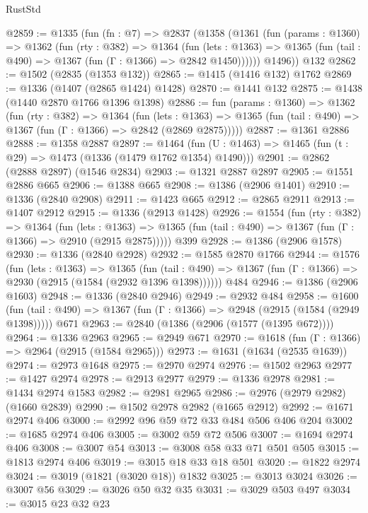 \begin{lexlean}{RustStd}
\begin{coremodule}
@2859 := @1335
    (fun (fn : @7) =>
    @2837
      (@1358
        (@1361
          (fun (params : @1360) =>
          @1362
            (fun (rty : @382) =>
            @1364
              (fun (lets : @1363) =>
              @1365 (fun (tail : @490) => @1367 (fun (Γ : @1366) => @2842 @1450))))))
        @1496))
    @132
@2862 := @1502 (@2835 (@1353 @132))
@2865 := @1415 (@1416 @132) @1762
@2869 := @1336 (@1407 (@2865 @1424) @1428)
@2870 := @1441 @132
@2875 := @1438 (@1440 @2870 @1766 @1396 @1398)
@2886 := fun (params : @1360) =>
  @1362
    (fun (rty : @382) =>
    @1364
      (fun (lets : @1363) =>
      @1365 (fun (tail : @490) => @1367 (fun (Γ : @1366) => @2842 (@2869 @2875)))))
@2887 := @1361 @2886
@2888 := @1358 @2887
@2897 := @1464 (fun (U : @1463) => @1465 (fun (t : @29) => @1473 (@1336 (@1479 @1762 @1354) @1490)))
@2901 := @2862 (@2888 @2897) (@1546 @2834)
@2903 := @1321 @2887 @2897
@2905 := @1551 @2886 @665
@2906 := @1388 @665
@2908 := @1386 (@2906 @1401)
@2910 := @1336 (@2840 @2908)
@2911 := @1423 @665
@2912 := @2865 @2911
@2913 := @1407 @2912
@2915 := @1336 (@2913 @1428)
@2926 := @1554
    (fun (rty : @382) =>
    @1364
      (fun (lets : @1363) =>
      @1365 (fun (tail : @490) => @1367 (fun (Γ : @1366) => @2910 (@2915 @2875)))))
    @399
@2928 := @1386 (@2906 @1578)
@2930 := @1336 (@2840 @2928)
@2932 := @1585 @2870 @1766
@2944 := @1576
    (fun (lets : @1363) =>
    @1365
      (fun (tail : @490) => @1367 (fun (Γ : @1366) => @2930 (@2915 (@1584 (@2932 @1396 @1398))))))
    @484
@2946 := @1386 (@2906 @1603)
@2948 := @1336 (@2840 @2946)
@2949 := @2932 @484
@2958 := @1600
    (fun (tail : @490) => @1367 (fun (Γ : @1366) => @2948 (@2915 (@1584 (@2949 @1398)))))
    @671
@2963 := @2840 (@1386 (@2906 (@1577 (@1395 @672))))
@2964 := @1336 @2963
@2965 := @2949 @671
@2970 := @1618 (fun (Γ : @1366) => @2964 (@2915 (@1584 @2965)))
@2973 := @1631 (@1634 (@2535 @1639))
@2974 := @2973 @1648
@2975 := @2970 @2974
@2976 := @1502 @2963
@2977 := @1427 @2974
@2978 := @2913 @2977
@2979 := @1336 @2978
@2981 := @1434 @2974 @1583
@2982 := @2981 @2965
@2986 := @2976 (@2979 @2982) (@1660 @2839)
@2990 := @1502 @2978 @2982 (@1665 @2912)
@2992 := @1671 @2974 @406
@3000 := @2992 @96 @59 @72 @33 @484 @506 @406 @204
@3002 := @1685 @2974 @406
@3005 := @3002 @59 @72 @506
@3007 := @1694 @2974 @406
@3008 := @3007 @54
@3013 := @3008 @58 @33 @71 @501 @505
@3015 := @1813 @2974 @406
@3019 := @3015 @18 @33 @18 @501
@3020 := @1822 @2974
@3024 := @3019 (@1821 (@3020 @18)) @1832
@3025 := @3013 @3024
@3026 := @3007 @56
@3029 := @3026 @50 @32 @35
@3031 := @3029 @503 @497
@3034 := @3015 @23 @32 @23

\end{coremodule}
\end{lexlean}
